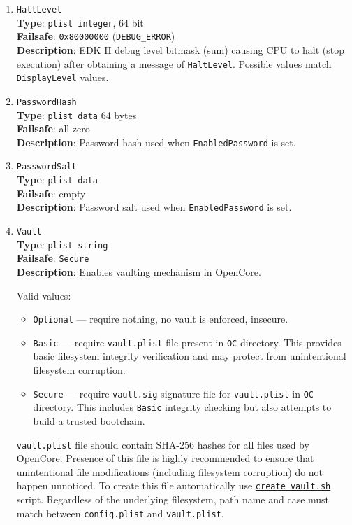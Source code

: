 \documentclass[]{article}
\providecommand{\tightlist}{%
  \setlength{\itemsep}{0pt}\setlength{\parskip}{0pt}}
\begin{document}
\begin{enumerate}
\item
  \texttt{HaltLevel}\\
  \textbf{Type}: \texttt{plist\ integer}, 64 bit\\
  \textbf{Failsafe}: \texttt{0x80000000} (\texttt{DEBUG\_ERROR})\\
  \textbf{Description}: EDK II debug level bitmask (sum) causing CPU to
  halt (stop execution) after obtaining a message of \texttt{HaltLevel}.
  Possible values match \texttt{DisplayLevel} values.

\item
  \texttt{PasswordHash}\\
  \textbf{Type}: \texttt{plist\ data} 64 bytes\\
  \textbf{Failsafe}: all zero\\
  \textbf{Description}: Password hash used when \texttt{EnabledPassword} is set.

\item
  \texttt{PasswordSalt}\\
  \textbf{Type}: \texttt{plist\ data}\\
  \textbf{Failsafe}: empty\\
  \textbf{Description}: Password salt used when \texttt{EnabledPassword} is set.

\item \label{securevaulting}
  \texttt{Vault}\\
  \textbf{Type}: \texttt{plist\ string}\\
  \textbf{Failsafe}: \texttt{Secure}\\
  \textbf{Description}: Enables vaulting mechanism in OpenCore.

  Valid values:

  \begin{itemize}
  \tightlist
  \item \texttt{Optional} --- require nothing, no vault is enforced, insecure.
  \item \texttt{Basic} --- require \texttt{vault.plist} file present
  in \texttt{OC} directory. This provides basic filesystem integrity
  verification and may protect from unintentional filesystem corruption.
  \item \texttt{Secure} --- require \texttt{vault.sig} signature file for
  \texttt{vault.plist} in \texttt{OC} directory. This includes \texttt{Basic}
  integrity checking but also attempts to build a trusted bootchain.
  \end{itemize}

  \texttt{vault.plist} file should contain SHA-256 hashes for all files used by OpenCore.
  Presence of this file is highly recommended to ensure that unintentional
  file modifications (including filesystem corruption) do not happen unnoticed.
  To create this file automatically use
  \href{https://github.com/acidanthera/OpenCorePkg/tree/master/Utilities/CreateVault}{\texttt{create\_vault.sh}} script.
  Regardless of the underlying filesystem, path name and case must match
  between \texttt{config.plist} and \texttt{vault.plist}.


\end{enumerate}
\end{document}
